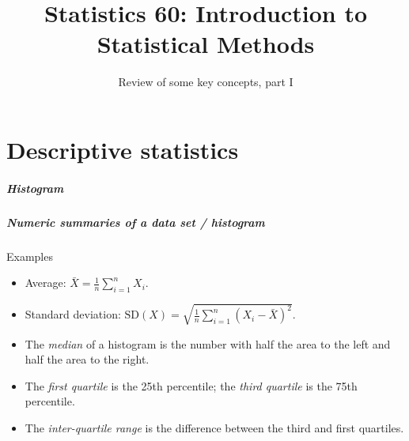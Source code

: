 \documentclass[handout]{beamer}
\title{Statistics 60: Introduction to Statistical Methods}
\subtitle{Review of some key concepts, part I}
\author{}%
\begin{document}
   \begin{frame}
   \titlepage
   \end{frame}

   \part{Descriptive statistics}
   \frame{\partpage}



   \begin{frame}
   \frametitle{Histogram}
   \begin{center}
   \end{center}

   \end{frame}


   \begin{frame} \frametitle{Numeric summaries of a data set / histogram}

   \begin{block}
   {Examples}
   \begin{itemize}
   \item Average:    $\bar{X} = \frac{1}{n} \sum_{i=1}^n X_i$.

     \item Standard deviation: $\text{SD}(X)=\sqrt{\frac{1}{n}\sum_{i=1}^n (X_i-\bar{X})^2}.$

       \item The {\em median} of a histogram is the number with half the area to
   the left and half the area to the right.

     \item The {\em first quartile} is the 25th percentile; the {\em third quartile} is the 75th percentile.

     \item The {\em inter-quartile range} is the difference between
     the third and first quartiles.

   \end{itemize}

   \end{block}
   \end{frame}
\end{document}
